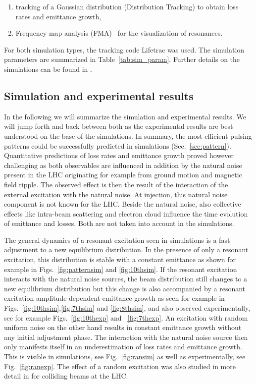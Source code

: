 \documentclass[%
 reprint,
 amsmath,amssymb,
 aps,
prstab,
]{revtex4-1}
\begin{document}
\begin{enumerate}
	\item tracking of a Gaussian distribution (Distribution Tracking) to obtain loss rates and emittance growth,
	\item Frequency map analysis (FMA)~\cite{fmalaskar} for the visualization of resonances.
\end{enumerate}
For both simulation types, the tracking code Lifetrac \cite{lifetrac} was used. The simulation parameters are summarized in Table~\ref{tab:sim_param}. Further details on the simulations can be found in \cite{md_sim_hel_res_ex_fitterer,resexmd2017}.

\subsection{Simulation and experimental results\label{sec:simex}}
In the following we will summarize the simulation and experimental results. We will jump forth and back between both as the experimental results are best understood on the base of the simulations. In summary, the most efficient pulsing patterns could be successfully predicted in simulations (Sec.~\ref{sec:pattern}). Quantitative predictions of loss rates and emittance growth proved however challenging as both observables are influenced in addition by the natural noise present in the LHC originating for example from ground motion and magnetic field ripple. The observed effect is then the result of the interaction of the external excitation with the natural noise. At injection, this natural noise component is not known for the LHC. Beside the natural noise, also collective effects like intra-beam scattering and electron cloud influence the time evolution of emittance and losses. Both are not taken into account in the simulations.

The general dynamics of a resonant excitation seen in simulations is a fast adjustment to a new equilibrium distribution. In the presence of only a resonant excitation, this distribution is stable with a constant emittance as shown for example in Figs.~\ref{fig:patternsim} and \ref{fig:10thsim}. If the resonant excitation interacts with the natural noise sources, the beam distribution still changes to a new equilibrium distribution but this change is also accompanied by a resonant excitation amplitude dependent emittance growth as seen for example in Figs.~\ref{fig:10thsim},\ref{fig:7thsim} and \ref{fig:8thsim}, and also observed experimentally, see for example Figs.~\ref{fig:10thexp} and ~\ref{fig:7thexp}. An excitation with random uniform noise on the other hand results in constant emittance growth without any initial adjustment phase. The interaction with the natural noise source then only manifests itself in an underestimation of loss rates and emittance growth. This is visible in simulations, see Fig.~\ref{fig:ransim} as well as experimentally, see Fig.~\ref{fig:ranexp}. The effect of a random excitation was also studied in more detail in \cite{md1433_noise_top_energy,md_noise_bbLHC} for colliding beams at the LHC.
\end{document}
